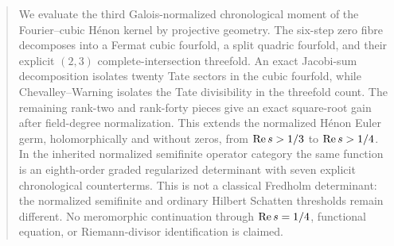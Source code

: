 \begin{abstract}
We evaluate the third Galois-normalized chronological moment of the
Fourier--cubic H\'enon kernel by projective geometry.  The six-step zero
fibre decomposes into a Fermat cubic fourfold, a split quadric fourfold, and
their explicit \((2,3)\) complete-intersection threefold.  An exact
Jacobi-sum decomposition isolates twenty Tate sectors in the cubic
fourfold, while Chevalley--Warning isolates the Tate divisibility in the
threefold count.  The remaining rank-two and rank-forty pieces give an
exact square-root gain after field-degree normalization.  This
extends the normalized H\'enon Euler germ, holomorphically and without
zeros, from \(\RePart s>1/3\) to \(\RePart s>1/4\).  In the inherited
normalized semifinite operator category the same function is an
eighth-order graded regularized determinant with seven explicit
chronological counterterms.  This is not a classical Fredholm determinant:
the normalized semifinite and ordinary Hilbert Schatten thresholds remain
different.  No meromorphic continuation through \(\RePart s=1/4\),
functional equation, or Riemann-divisor identification is claimed.
\end{abstract}
